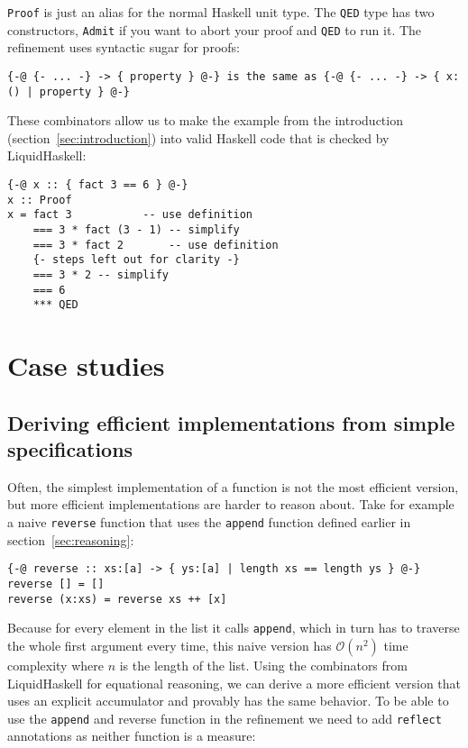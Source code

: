 \documentclass[acmlarge,screen,authorversion=true,nonacm=true]{acmart}
\renewcommand\O[1]{$\mathcal{O}(#1)$}
\begin{document}
\texttt{Proof} is just an alias for the normal Haskell unit type. The \texttt{QED} type has two constructors, \texttt{Admit} if you want to abort your proof and \texttt{QED} to run it. The refinement uses syntactic sugar for proofs:

\begin{lstlisting}
{-@ {- ... -} -> { property } @-} is the same as {-@ {- ... -} -> { x:() | property } @-}
\end{lstlisting}

These combinators allow us to make the example from the introduction (section~\ref{sec:introduction}) into valid Haskell code that is checked by LiquidHaskell:

\begin{lstlisting}
{-@ x :: { fact 3 == 6 } @-}
x :: Proof
x = fact 3           -- use definition
    === 3 * fact (3 - 1) -- simplify
    === 3 * fact 2       -- use definition
    {- steps left out for clarity -}
    === 3 * 2 -- simplify
    === 6
    *** QED
\end{lstlisting}


\section{Case studies}\label{sec:case_studies}

\subsection{Deriving efficient implementations from simple specifications}\label{sec:efficient}

Often, the simplest implementation of a function is not the most efficient version, but more efficient implementations are harder to reason about. Take for example a naive \texttt{reverse} function that uses the \texttt{append} function defined earlier in section~\ref{sec:reasoning}:

\begin{lstlisting}
{-@ reverse :: xs:[a] -> { ys:[a] | length xs == length ys } @-}
reverse [] = []
reverse (x:xs) = reverse xs ++ [x]
\end{lstlisting}

Because for every element in the list it calls \texttt{append}, which in turn has to traverse the whole first argument every time, this naive version has \O{n^2} time complexity where $n$ is the length of the list. Using the combinators from LiquidHaskell for equational reasoning, we can derive a more efficient version that uses an explicit accumulator and provably has the same behavior. To be able to use the \texttt{append} and reverse function in the refinement we need to add \texttt{reflect} annotations as neither function is a measure:
\end{document}
